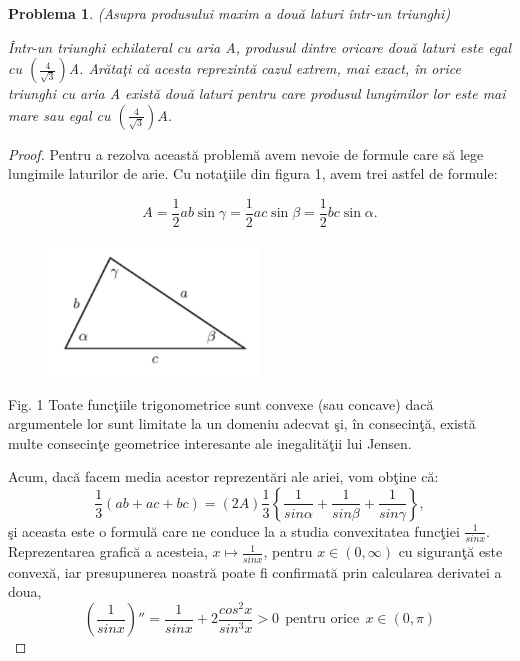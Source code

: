\documentclass[a4paper,12pt,oneside]{report}
\newtheorem{problem}{Problema}
\begin{document}
\begin{problem}(Asupra produsului maxim a dou\u{a} laturi \^{i}ntr-un triunghi)

\^{I}ntr-un triunghi echilateral cu aria A, produsul dintre oricare dou\u{a} laturi este egal cu \(\left (\frac{4}{\sqrt{3}}  \right )\)A. Ar\u{a}ta\c{t}i c\u{a} acesta reprezint\u{a} cazul extrem, mai exact, \^{i}n orice triunghi cu aria A  exist\u{a} dou\u{a} laturi pentru care produsul lungimilor lor este mai mare sau egal cu \(\left (\frac{4}{\sqrt{3}}  \right )A\).
\end{problem}
\begin{proof}
  Pentru a rezolva aceast\u{a} problem\u{a} avem nevoie de formule care s\u{a} lege lungimile laturilor de arie. Cu nota\c{t}iile din figura 1, avem trei astfel de formule:

\begin{displaymath}
  A = \frac{1}{2}ab \sin\gamma = \frac{1}{2}ac \sin \beta = \frac{1}{2}bc \sin \alpha.
\end{displaymath}

\begin{figure}[htbp]
	\centering
	\includegraphics[width=0.5\textwidth]{fig2.1.png}
	\caption{}
\end{figure}

Fig. 1  Toate func\c{t}iile trigonometrice sunt convexe (sau concave) dac\u{a}
argumentele lor sunt limitate la un domeniu adecvat \c{s}i, \^{i}n consecin\c{t}\u{a},
exist\u{a} multe consecin\c{t}e geometrice interesante ale inegalit\u{a}\c{t}ii lui Jensen.


Acum, dac\u{a} facem media acestor reprezent\u{a}ri ale ariei, vom ob\c{t}ine c\u{a}:
\begin{displaymath}
  \frac{1}{3}\left ( ab + ac + bc \right )= \left ( 2A \right )\frac{1}{3}\left \{ \frac{1}{sin \alpha } + \frac{1}{sin \beta } + \frac{1}{sin \gamma }\right \}, \label{eq:2.1} \tag{2.1}
\end{displaymath}
\c{s}i aceasta este o formul\u{a} care ne conduce la a studia convexitatea func\c{t}iei \(\frac{1}{sin x}\). Reprezentarea grafic\u{a} a acesteia, \(x \mapsto \frac{1}{sin x}\), pentru \(x\in \left ( 0, \infty  \right )\) cu siguran\c{t}\u{a} este convex\u{a}, iar presupunerea noastr\u{a} poate fi confirmat\u{a} prin calcularea derivatei a doua,
\begin{displaymath}
  {\left ( \frac{1}{sin x} \right )}''= \frac{1}{sin x} + 2\frac{cos^{2}x}{sin ^{3}x}> 0~~ \text{pentru orice}~~ x\in \left ( 0, \pi  \right )  \label{eq:2.2} \tag{2.2}
\end{displaymath}


\end{proof}
\end{document}
